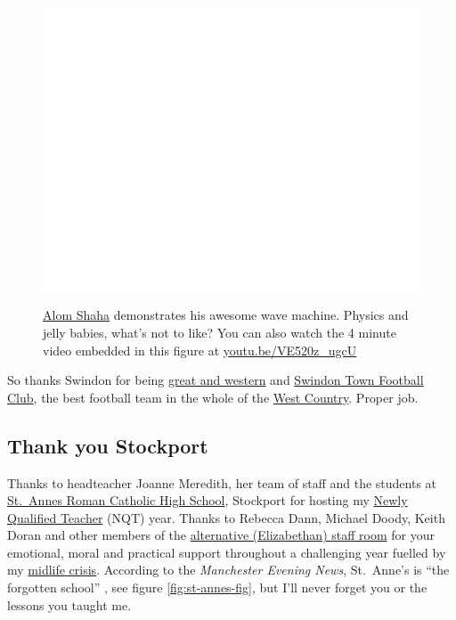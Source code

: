 \documentclass[
]{book}
\begin{document}
\begin{figure}

{\centering \href{https://www.youtube.com/embed/VE520z_ugcU}{\includegraphics[width=0.99\linewidth]{cdyf_files/figure-latex/shaha-fig-1} }

}

\caption{\href{https://alomshaha.com/}{Alom Shaha} demonstrates his awesome wave machine. Physics and jelly babies, what's not to like? You can also watch the 4 minute video embedded in this figure at \href{https://youtu.be/VE520z_ugcU}{youtu.be/VE520z\_ugcU} \citep{youtube-alom}}\label{fig:shaha-fig}
\end{figure}



So thanks Swindon for being \href{https://en.wikipedia.org/wiki/Great_Western_Railway}{great and western} and \href{https://en.wikipedia.org/wiki/Swindon_Town_F.C.}{Swindon Town Football Club}, the best football team in the whole of the \href{https://en.wikipedia.org/wiki/West_Country}{West Country}. Proper job. 🙏

\hypertarget{stockport}{%
\subsection{Thank you Stockport}\label{stockport}}

Thanks to headteacher Joanne Meredith, her team of staff and the students at \href{https://en.wikipedia.org/wiki/St_Anne\%27s_RC_Voluntary_Academy}{St.~Annes Roman Catholic High School}, Stockport for hosting my \href{https://en.wikipedia.org/wiki/Newly_qualified_teacher}{Newly Qualified Teacher} (NQT) year. Thanks to Rebecca Dann, Michael Doody, Keith Doran and other members of the \href{https://www.elizabethanstockport.co.uk/}{alternative (Elizabethan) staff room} for your emotional, moral and practical support throughout a challenging year fuelled by my \href{https://en.wikipedia.org/wiki/Midlife_crisis}{midlife crisis}. According to the \emph{Manchester Evening News}, St.~Anne's is ``the forgotten school'' \citep{stannes1, stannes2}, see figure \ref{fig:st-annes-fig}, but I'll never forget you or the lessons you taught me.
\end{document}
